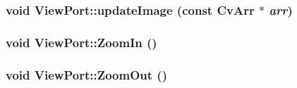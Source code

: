 \label{classViewPort_a2618b2c40f1770ab153cbae4da9c5313}
\hypertarget{classViewPort_a19c83263889430a83e5f9d1aaee4741b}{
\subsubsection[{updateImage}]{\setlength{\rightskip}{0pt plus 5cm}void ViewPort::updateImage (const CvArr $\ast$ {\em arr})}}
\label{classViewPort_a19c83263889430a83e5f9d1aaee4741b}
\hypertarget{classViewPort_a4a67d1ac61dfdf063909b9fa5299893f}{
\subsubsection[{ZoomIn}]{\setlength{\rightskip}{0pt plus 5cm}void ViewPort::ZoomIn ()}}
\label{classViewPort_a4a67d1ac61dfdf063909b9fa5299893f}
\hypertarget{classViewPort_a4f26ce0e84539f49b95aa5d43820bb85}{
\subsubsection[{ZoomOut}]{\setlength{\rightskip}{0pt plus 5cm}void ViewPort::ZoomOut ()}}
\label{classViewPort_a4f26ce0e84539f49b95aa5d43820bb85}


